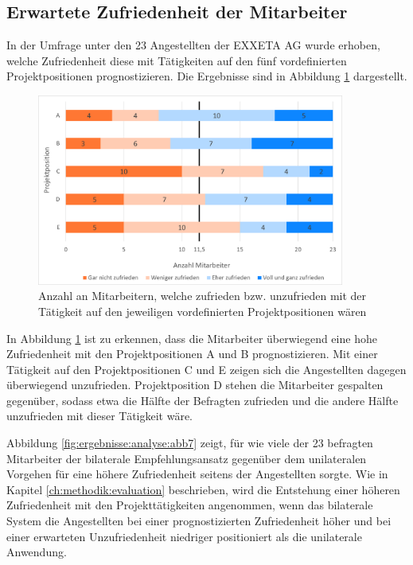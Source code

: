 \subsection{Erwartete Zufriedenheit der Mitarbeiter}
\label{ch:ergebnisse:fallstudie:umfrageMitarbeiter}
In der Umfrage unter den 23 Angestellten der EXXETA AG wurde erhoben, welche Zufriedenheit diese mit Tätigkeiten auf den fünf vordefinierten Projektpositionen prognostizieren. Die Ergebnisse sind in Abbildung \ref{fig:ergebnisse:fallstudie:abb1} dargestellt.

\begin{figure}[h]
	\centering
	\includegraphics[width=0.9\textwidth]{gfx/mitarbeiter-zufriedenheit-umfrage.png}
	\caption{Anzahl an Mitarbeitern, welche zufrieden bzw. unzufrieden mit der Tätigkeit auf den jeweiligen vordefinierten Projektpositionen wären}
	\label{fig:ergebnisse:fallstudie:abb1}
\end{figure}

In Abbildung \ref{fig:ergebnisse:fallstudie:abb1} ist zu erkennen, dass die Mitarbeiter überwiegend eine hohe Zufriedenheit mit den Projektpositionen A und B prognostizieren. Mit einer Tätigkeit auf den Projektpositionen C und E zeigen sich die Angestellten dagegen überwiegend unzufrieden. Projektposition D stehen die Mitarbeiter gespalten gegenüber, sodass etwa die Hälfte der Befragten zufrieden und die andere Hälfte unzufrieden mit dieser Tätigkeit wäre.

Abbildung \ref{fig:ergebnisse:analyse:abb7} zeigt, für wie viele der 23 befragten Mitarbeiter der bilaterale Empfehlungsansatz gegenüber dem unilateralen Vorgehen für eine höhere Zufriedenheit seitens der Angestellten sorgte. Wie in Kapitel \ref{ch:methodik:evaluation} beschrieben, wird die Entstehung einer höheren Zufriedenheit mit den Projekttätigkeiten angenommen, wenn das bilaterale System die Angestellten bei einer prognostizierten Zufriedenheit höher und bei einer erwarteten Unzufriedenheit niedriger positioniert als die unilaterale Anwendung.

